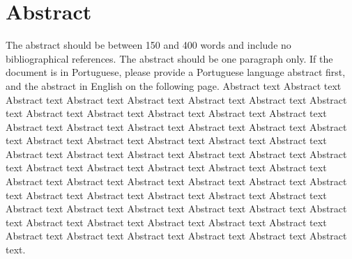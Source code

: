 \chapter*{Abstract}

The abstract should be between 150 and 400 words and include no bibliographical
references. The abstract should be one paragraph only. If the document is in Portuguese,
please provide a Portuguese language abstract first, and the abstract in English on the
following page. Abstract text Abstract text Abstract text Abstract text Abstract text Abstract
text Abstract text Abstract text Abstract text Abstract text Abstract text Abstract text
Abstract text Abstract text Abstract text Abstract text Abstract text Abstract text Abstract
text Abstract text Abstract text Abstract text Abstract text Abstract text Abstract text
Abstract text Abstract text Abstract text Abstract text Abstract text Abstract text Abstract
text Abstract text Abstract text Abstract text Abstract text Abstract text Abstract text
Abstract text Abstract text Abstract text Abstract text Abstract text Abstract text Abstract
text Abstract text Abstract text Abstract text Abstract text Abstract text Abstract text
Abstract text Abstract text Abstract text Abstract text Abstract text Abstract text Abstract
text Abstract text Abstract text Abstract text Abstract text Abstract text.

